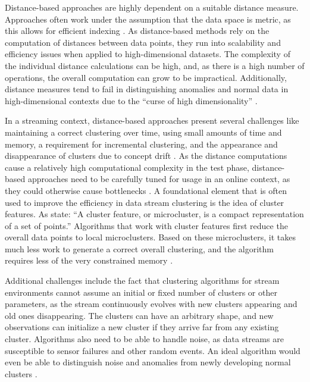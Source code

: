 Distance-based approaches are highly dependent on a suitable distance measure. Approaches often work under the assumption that the data space is metric, as this allows for efficient indexing \citep{kontaki_continuous_2011}. As distance-based methods rely on the computation of distances between data points, they run into scalability and efficiency issues when applied to high-dimensional datasets. The complexity of the individual distance calculations can be high, and, as there is a high number of operations, the overall computation can grow to be impractical. Additionally, distance measures tend to fail in distinguishing anomalies and normal data in high-dimensional contexts due to the ``curse of high dimensionality'' \citep{pimentel_review_2014}.

In a streaming context, distance-based approaches present several challenges like maintaining a correct clustering over time, using small amounts of time and memory, a requirement for incremental clustering, and the appearance and disappearance of clusters due to concept drift \citep{gama_survey_2012}. As the distance computations cause a relatively high computational complexity in the test phase, distance-based approaches need to be carefully tuned for usage in an online context, as they could otherwise cause bottlenecks \citep{pimentel_review_2014}. A foundational element that is often used to improve the efficiency in data stream clustering is the idea of cluster features. As \citet{gama_survey_2012} state: ``A cluster feature, or microcluster, is a compact representation of a set of points.'' Algorithms that work with cluster features first reduce the overall data points to local microclusters. Based on these microclusters, it takes much less work to generate a correct overall clustering, and the algorithm requires less of the very constrained memory \citep{gama_survey_2012, cao_density-based_2006}.

Additional challenges include the fact that clustering algorithms for stream environments cannot assume an initial or fixed number of clusters or other parameters, as the stream continuously evolves with new clusters appearing and old ones disappearing. The clusters can have an arbitrary shape, and new observations can initialize a new cluster if they arrive far from any existing cluster. Algorithms also need to be able to handle noise, as data streams are susceptible to sensor failures and other random events. An ideal algorithm would even be able to distinguish noise and anomalies from newly developing normal clusters \citep{cao_density-based_2006}.



